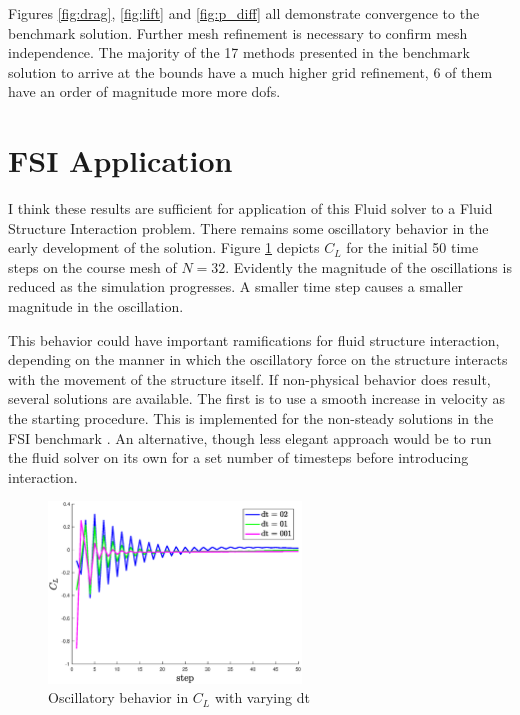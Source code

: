 \documentclass{article}
\begin{document}
Figures \ref{fig:drag}, \ref{fig:lift} and  \ref{fig:p_diff} all demonstrate convergence to the benchmark solution. Further mesh refinement is necessary to confirm mesh independence. The majority of the 17 methods presented in the benchmark solution to arrive at the bounds have a much higher grid refinement, 6 of them have an order of magnitude more more dofs. 

\section{FSI Application} 

I think these results are sufficient for application of this Fluid solver to a Fluid Structure Interaction problem. There remains some oscillatory behavior in the early development of the solution. Figure \ref{fig:dt_bench} depicts $C_L$ for the initial 50 time steps on the course mesh of $N = 32$. Evidently the magnitude of the oscillations is reduced as the simulation progresses. A smaller time step causes a smaller magnitude in the oscillation. 

This behavior could have important ramifications for fluid structure interaction, depending on the manner in which the oscillatory force on the structure interacts with the movement of the structure itself. If non-physical behavior does result, several solutions are available. The first is to use a smooth increase in velocity as the starting procedure. This is implemented for the non-steady solutions in the FSI benchmark \cite{turek2006proposal}. An alternative, though less elegant approach would be to run the fluid solver on its own for a set number of timesteps before introducing interaction. 

\FloatBarrier
\begin{figure}[h]
\centering
	\includegraphics[width=0.6\textwidth]{dt_bench}
	\caption{Oscillatory behavior in $C_L$ with varying dt}
	\label{fig:dt_bench}
\end{figure}
\FloatBarrier

{}

\end{document}
